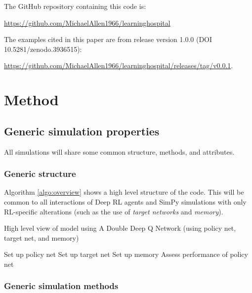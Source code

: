 \documentclass{article}
\begin{document}
\begin{multicols}{2}
The GitHub repository containing this code is:

\url{https://github.com/MichaelAllen1966/learninghospital}

The examples cited in this paper are from release version 1.0.0 (DOI 10.5281/zenodo.3936515):

\url{https://github.com/MichaelAllen1966/learninghospital/releases/tag/v0.0.1}.

\section{Method}

\subsection{Generic simulation properties}

All simulations will share some common structure, methods, and attributes.

\subsubsection{Generic structure}

Algorithm \ref{algo:overview} shows a high level structure of the code. This will be common to all interactions of Deep RL agents and SimPy simulations with only RL-specific alterations (such as the use of \emph{target networks} and \emph{memory}).

\begin{algorithm}[H]
\caption{High level view of model using A Double Deep Q Network (using policy net, target net, and memory)}
\SetAlgoLined
Set up policy net\;
Set up target net\;
Set up memory\;
Assess performance of policy net\;
\label{algo:overview}    
\end{algorithm}

\subsubsection{Generic simulation methods}


\end{multicols}
\end{document}
